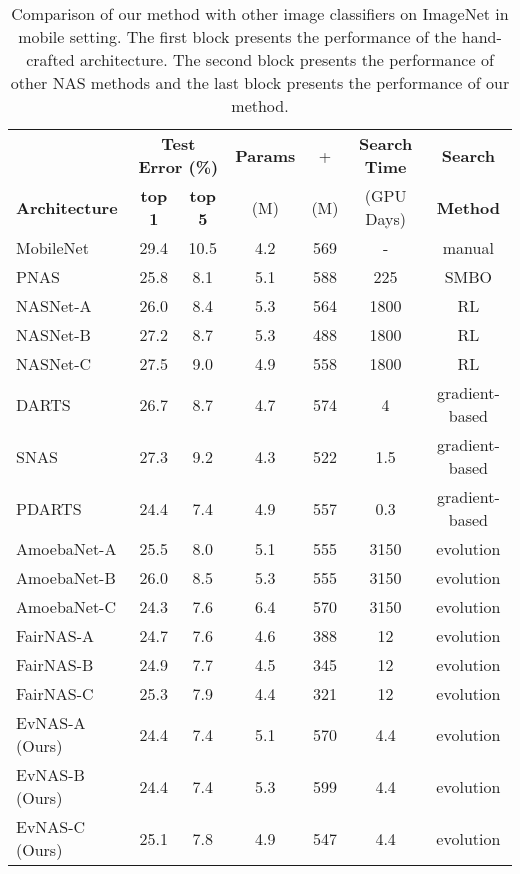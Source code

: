 \documentclass[final]{cvpr}
\begin{document}
\begin{table*}[t]
    \caption{Comparison of our method with other image classifiers on ImageNet in mobile setting.
    The first block presents the performance of the hand-crafted architecture. The second block
    presents the performance of other NAS methods and the last block presents the performance of our
    method.}
    \label{table:imagenet}
    \centering
    \begin{tabular}{lcccccc}
\hline
     &  \multicolumn{2}{c}{\bf{Test Error (\%)}} & \bf{Params} &+& \bf{Search Time} &\bf{Search} \\
    \bf{Architecture} & \bf{top 1} & \bf{top 5} & (M) & (M) & (GPU Days) & \bf{Method} \\
\hline
MobileNet            \cite{howard2017mobilenets}&29.4& 10.5    & 4.2 & 569 & - & manual\\ 
    \hline
    PNAS            \cite{liu2018progressive}  &25.8& 8.1    & 5.1 & 588 & 225 & SMBO\\
    NASNet-A             \cite{zoph2018learning}    & 26.0 & 8.4      & 5.3 & 564 &1800& RL\\
    NASNet-B             \cite{zoph2018learning}    & 27.2  & 8.7     & 5.3 & 488 &1800& RL\\
    NASNet-C             \cite{zoph2018learning}    & 27.5  & 9.0     & 4.9 & 558 &1800& RL\\
    
    DARTS  \cite{liu2018darts2}       & 26.7  & 8.7 & 4.7 & 574 &4& gradient-based\\
    SNAS                 \cite{xie2018snas}         & 27.3  & 9.2 & 4.3 & 522 &1.5& gradient-based\\
    PDARTS               \cite{chen2019progressive} & 24.4  & 7.4 & 4.9 & 557 &0.3& gradient-based\\
    
    AmoebaNet-A          \cite{real2019regularized} & 25.5 & 8.0 & 5.1 & 555 &3150& evolution\\
    AmoebaNet-B          \cite{real2019regularized} & 26.0 & 8.5 & 5.3 & 555 &3150& evolution\\
    AmoebaNet-C          \cite{real2019regularized} & 24.3 & 7.6 & 6.4 & 570 &3150& evolution\\
    FairNAS-A          \cite{chu2019fairnas} & 24.7 & 7.6 & 4.6 & 388 &12& evolution\\
    FairNAS-B          \cite{chu2019fairnas} & 24.9 & 7.7 & 4.5 & 345 &12& evolution\\
    FairNAS-C          \cite{chu2019fairnas} & 25.3 & 7.9 & 4.4 & 321 &12& evolution\\
    \hline
    EvNAS-A (Ours)                                     & 24.4 & 7.4 & 5.1 & 570 & 4.4 & evolution\\
    EvNAS-B (Ours)                                     & 24.4 & 7.4 & 5.3 & 599 & 4.4 & evolution\\
    EvNAS-C (Ours)                                     & 25.1 & 7.8 & 4.9 & 547 & 4.4 & evolution\\
    
    \end{tabular}
\end{table*}
\end{document}
